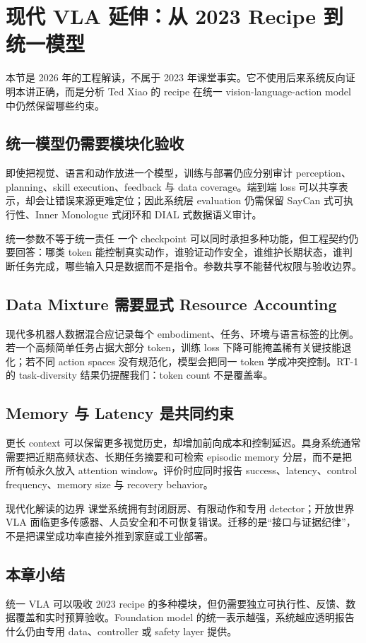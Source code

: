 \section{现代 VLA 延伸：从 2023 Recipe 到统一模型}

本节是 2026 年的工程解读，不属于 2023 年课堂事实。它不使用后来系统反向证明本讲正确，而是分析 Ted Xiao 的 recipe 在统一 vision-language-action model 中仍然保留哪些约束。

\subsection{统一模型仍需要模块化验收}

即使把视觉、语言和动作放进一个模型，训练与部署仍应分别审计 perception、planning、skill execution、feedback 与 data coverage。端到端 loss 可以共享表示，却会让错误来源更难定位；因此系统层 evaluation 仍需保留 SayCan 式可执行性、Inner Monologue 式闭环和 DIAL 式数据语义审计。

\begin{importantbox}{统一参数不等于统一责任}
一个 checkpoint 可以同时承担多种功能，但工程契约仍要回答：哪类 token 能控制真实动作，谁验证动作安全，谁维护长期状态，谁判断任务完成，哪些输入只是数据而不是指令。参数共享不能替代权限与验收边界。
\end{importantbox}

\subsection{Data Mixture 需要显式 Resource Accounting}

现代多机器人数据混合应记录每个 embodiment、任务、环境与语言标签的比例。若一个高频简单任务占据大部分 token，训练 loss 下降可能掩盖稀有关键技能退化；若不同 action spaces 没有规范化，模型会把同一 token 学成冲突控制。RT-1 的 task-diversity 结果仍提醒我们：token count 不是覆盖率。

\subsection{Memory 与 Latency 是共同约束}

更长 context 可以保留更多视觉历史，却增加前向成本和控制延迟。具身系统通常需要把近期高频状态、长期任务摘要和可检索 episodic memory 分层，而不是把所有帧永久放入 attention window。评价时应同时报告 success、latency、control frequency、memory size 与 recovery behavior。

\begin{warningbox}{现代化解读的边界}
课堂系统拥有封闭厨房、有限动作和专用 detector；开放世界 VLA 面临更多传感器、人员安全和不可恢复错误。迁移的是“接口与证据纪律”，不是把课堂成功率直接外推到家庭或工业部署。
\end{warningbox}

\subsection{本章小结}

统一 VLA 可以吸收 2023 recipe 的多种模块，但仍需要独立可执行性、反馈、数据覆盖和实时预算验收。Foundation model 的统一表示越强，系统越应透明报告什么仍由专用 data、controller 或 safety layer 提供。

